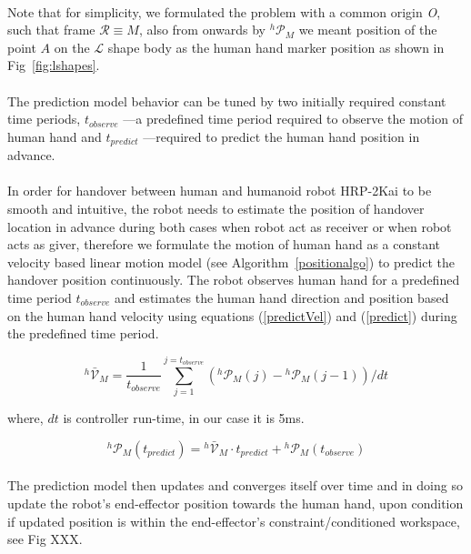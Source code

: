 \documentclass[a4paper, 12pt, oneside]{Thesis}  %
\begin{document}
\paragraph*{}
Note that for simplicity, we formulated the problem with a common origin {\it O}, such that frame $\mathcal R \equiv M$, also from onwards by ${}^{h}\mathcal{P}_M$ we meant position of the point $A$ on the $\mathcal{L}$ shape body as the human hand marker position as shown in Fig~\ref{fig:lshapes}.


\paragraph*{}
The prediction model behavior can be tuned by two initially required constant time periods, $t_{observe}$ ---a predefined time period required to observe the motion of human hand and $t_{predict}$ ---required to predict the human hand position in advance.

\paragraph*{}
In order for handover between human and humanoid robot HRP-2Kai to be smooth and intuitive, the robot needs to estimate the position of handover location in advance during both cases when robot act as receiver or when robot acts as giver, therefore we formulate the motion of human hand as a constant velocity based linear motion model (see Algorithm~\ref{positionalgo}) to predict the handover position continuously. The robot observes human hand for a predefined time period $t_{observe}$ and estimates the human hand direction and position based on the human hand velocity using equations (\ref{predictVel}) and (\ref{predict}) during the predefined time period. 

\begin{equation} \label{predictVel}
{}^{h}\mathcal{\bar{V}}_{M} = \frac{1}{t_{observe}}{\sum_{j=1}^{j=t_{observe}} ({}^{h}\mathcal{P}_{M}(j)-{}^{h}\mathcal{P}_{M}(j-1))/dt }
\end{equation}

where, $dt$ is controller run-time, in our case it is 5ms.

\begin{equation} \label{predict}
{}^{h}\mathcal{P}_M(t_{predict}) = {}^{h}\mathcal{\bar{V}}_{M} \cdot t_{predict}  + {}^{h}\mathcal{P}_{M}(t_{observe})
\end{equation}

\paragraph*{}
The prediction model then updates and converges itself over time and in doing so update the robot's end-effector position towards the human hand, upon condition if updated position is within the end-effector's constraint/conditioned workspace, see Fig XXX.
\end{document}
